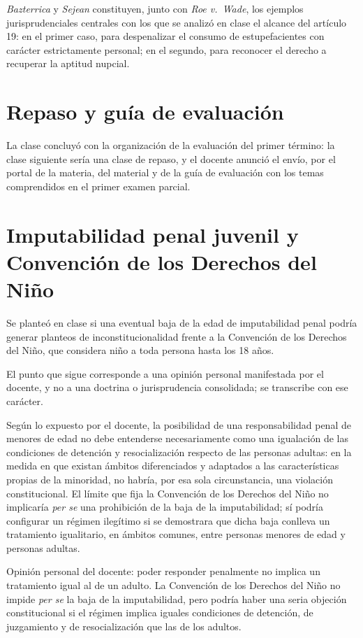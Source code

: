 \documentclass[12pt,oneside]{book}
\begin{document}
\emph{Bazterrica} y \emph{Sejean} constituyen, junto con \emph{Roe v.\ Wade}, los ejemplos jurisprudenciales centrales con los que se analizó en clase el alcance del artículo 19: en el primer caso, para despenalizar el consumo de estupefacientes con carácter estrictamente personal; en el segundo, para reconocer el derecho a recuperar la aptitud nupcial.

\section{Repaso y guía de evaluación}

La clase concluyó con la organización de la evaluación del primer término: la clase siguiente sería una clase de repaso, y el docente anunció el envío, por el portal de la materia, del material y de la guía de evaluación con los temas comprendidos en el primer examen parcial.

\section{Imputabilidad penal juvenil y Convención de los Derechos del Niño}

Se planteó en clase si una eventual baja de la edad de imputabilidad penal podría generar planteos de inconstitucionalidad frente a la Convención de los Derechos del Niño, que considera niño a toda persona hasta los 18 años.

\begin{note}
El punto que sigue corresponde a una opinión personal manifestada por el docente, y no a una doctrina o jurisprudencia consolidada; se transcribe con ese carácter.
\end{note}

Según lo expuesto por el docente, la posibilidad de una responsabilidad penal de menores de edad no debe entenderse necesariamente como una igualación de las condiciones de detención y resocialización respecto de las personas adultas: en la medida en que existan ámbitos diferenciados y adaptados a las características propias de la minoridad, no habría, por esa sola circunstancia, una violación constitucional. El límite que fija la Convención de los Derechos del Niño no implicaría \emph{per se} una prohibición de la baja de la imputabilidad; sí podría configurar un régimen ilegítimo si se demostrara que dicha baja conlleva un tratamiento igualitario, en ámbitos comunes, entre personas menores de edad y personas adultas.

\begin{important}
Opinión personal del docente: poder responder penalmente no implica un tratamiento igual al de un adulto. La Convención de los Derechos del Niño no impide \emph{per se} la baja de la imputabilidad, pero podría haber una seria objeción constitucional si el régimen implica iguales condiciones de detención, de juzgamiento y de resocialización que las de los adultos.
\end{important}
\end{document}
